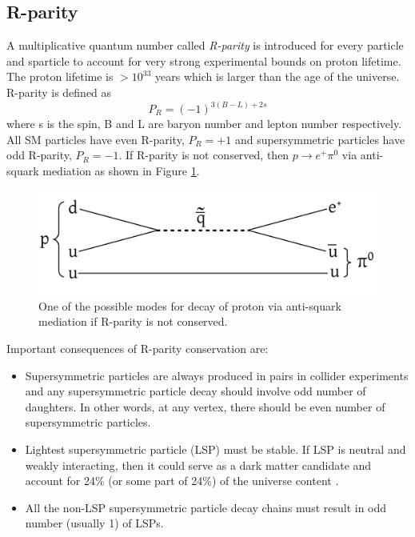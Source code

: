 \subsection{R-parity}
A multiplicative quantum number called \textit{R-parity} is introduced for every particle and sparticle to account for very strong 
experimental bounds on proton lifetime. The proton lifetime is $>10^{33}$ years \cite{PhysRevLett.102.141801} which is larger than the age 
of the universe.
R-parity is defined as
\begin{equation}
\label{eqn:rparity}
P_R = (-1)^{3(B-L)+2s}
\end{equation}
where s is the spin, B and L are baryon number and lepton number respectively. All SM particles have even R-parity, $P_R=+1$ and 
supersymmetric particles have odd R-parity, $P_R=-1$. If R-parity is not conserved, then $p\to e^+\pi^{0}$ via anti-squark mediation as 
shown in Figure \ref{fig:protonDecay}.
\begin{figure}[h!]
\centering
\includegraphics[width=0.7\linewidth]{../Figures/Chap1/protonDecay}
\caption[Proton decay diagram]{One of the possible modes for decay of proton via anti-squark mediation if R-parity is not conserved.}
\label{fig:protonDecay}
\end{figure}

Important consequences \cite{Martin:1997ns} of R-parity conservation are:
\begin{itemize}
\item Supersymmetric particles are always produced in pairs in collider experiments
and any supersymmetric particle decay should involve odd number of daughters.
In other words, at any vertex, there should be even number of supersymmetric particles.
\item Lightest supersymmetric particle (LSP) must be stable. If LSP is neutral and weakly interacting, then it could serve as a dark matter 
candidate and account for 24\% (or some part of 24\%) of the universe content \cite{ELLIS1984453}.
\item All the non-LSP supersymmetric particle decay chains must result in odd number (usually 1) of LSPs.
\end{itemize}

